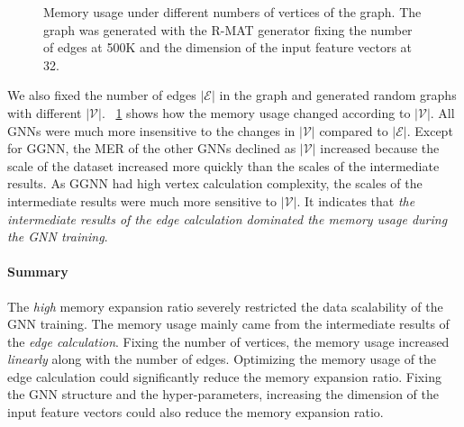 \begin{figure}
    \centering
    \caption{Memory usage under different numbers of vertices of the graph. The graph was generated with the R-MAT generator fixing the number of edges at 500K and the dimension of the input feature vectors at 32.}
    \label{fig:exp_memory_expansion_ratio_input_graph_number_of_vertices_fixed_edge}
\end{figure}

We also fixed the number of edges $|\mathcal{E}|$ in the graph and generated random graphs with different $|\mathcal{V}|$.
\figurename~\ref{fig:exp_memory_expansion_ratio_input_graph_number_of_vertices_fixed_edge} shows how the memory usage changed according to $|\mathcal{V}|$.
All GNNs were much more insensitive to the changes in $|\mathcal{V}|$ compared to $|\mathcal{E}|$.
Except for GGNN, the MER of the other GNNs declined as $|\mathcal{V}|$ increased because the scale of the dataset increased more quickly than the scales of the intermediate results.
As GGNN had high vertex calculation complexity, the scales of the intermediate results were much more sensitive to $|\mathcal{V}|$.
It indicates that \emph{the intermediate results of the edge calculation dominated the memory usage during the GNN training}.

\paragraph{Summary}
The \emph{high} memory expansion ratio severely restricted the data scalability of the GNN training.
The memory usage mainly came from the intermediate results of the \emph{edge calculation}.
Fixing the number of vertices, the memory usage increased \emph{linearly} along with the number of edges.
Optimizing the memory usage of the edge calculation could significantly reduce the memory expansion ratio.
Fixing the GNN structure and the hyper-parameters, increasing the dimension of the input feature vectors could also reduce the memory expansion ratio.

